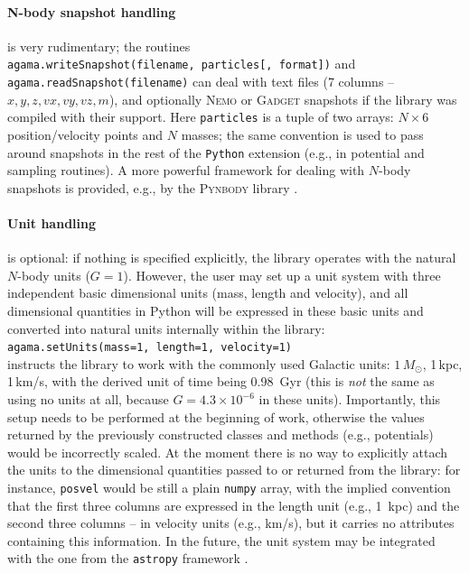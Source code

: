 \documentclass[12pt]{article}
\newcommand{\Nemo} {\textsc{Nemo}\xspace}
\newcommand{\Python}{\texttt{Python}\xspace}
\newcommand{\ppp}[1]{\textcolor{darkolive} {\texttt{#1}}}
\begin{document}
\paragraph{N-body snapshot handling} \label{sec:PythonSnapshot} is very rudimentary; the routines\\
\texttt{agama.writeSnapshot(filename, particles[, format])} and\\ \texttt{agama.readSnapshot(filename)} can deal with text files (7 columns -- $x,y,z,vx,vy,vz,m$), and optionally \Nemo or \textsc{Gadget} snapshots if the library was compiled with their support. Here \ppp{particles} is a tuple of two arrays: $N\times6$ position/velocity points and $N$ masses; the same convention is used to pass around snapshots in the rest of the \Python extension (e.g., in potential and sampling routines). A more powerful framework for dealing with $N$-body snapshots is provided, e.g., by the \textsc{Pynbody} library \cite{Pynbody}.

\paragraph{Unit handling} is optional: if nothing is specified explicitly, the library operates with the natural $N$-body units ($G=1$). However, the user may set up a unit system with three independent basic dimensional units (mass, length and velocity), and all dimensional quantities in Python will be expressed in these basic units and converted into natural units internally within the library:\\
\texttt{agama.setUnits(mass=1, length=1, velocity=1)}\\
instructs the library to work with the commonly used Galactic units: $1\,M_\odot$, 1\,kpc, 1\,km/s, with the derived unit of time being 0.98~Gyr (this is \textit{not} the same as using no units at all, because $G=4.3\times10^{-6}$ in these units). Importantly, this setup needs to be performed at the beginning of work, otherwise the values returned by the previously constructed classes and methods (e.g., potentials) would be incorrectly scaled.
At the moment there is no way to explicitly attach the units to the dimensional quantities passed to or returned from the library: for instance, \texttt{posvel} would be still a plain \texttt{numpy} array, with the implied convention that the first three columns are expressed in the length unit (e.g., 1~kpc) and the second three columns -- in velocity units (e.g., km/s), but it carries no attributes containing this information. In the future, the unit system may be integrated with the one from the \texttt{astropy} framework \cite{Astropy}.
\end{document}
